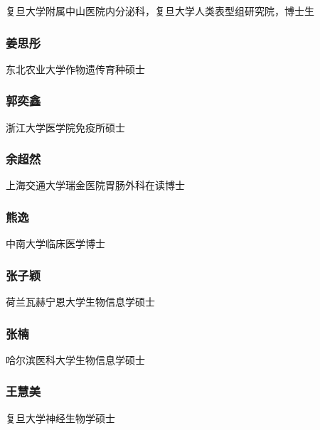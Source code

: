 \documentclass[]{article}
\begin{document}
复旦大学附属中山医院内分泌科，复旦大学人类表型组研究院，博士生

\subsubsection{姜思彤}

东北农业大学作物遗传育种硕士

\subsubsection{郭奕鑫}

浙江大学医学院免疫所硕士

\subsubsection{余超然}

上海交通大学瑞金医院胃肠外科在读博士

\subsubsection{熊逸}

中南大学临床医学博士

\subsubsection{张子颖}

荷兰瓦赫宁恩大学生物信息学硕士

\subsubsection{张楠}

哈尔滨医科大学生物信息学硕士

\subsubsection{王慧美}

复旦大学神经生物学硕士
\end{document}
